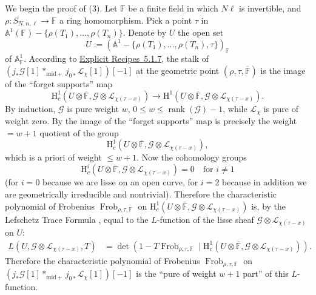 We begin the proof of (3). Let \(\mathbb{F}\) be a finite field in which
\(N\ell\) is invertible, and \(\rho:S_{N,n,\ell}\to\mathbb{F}\) a ring
homomorphism. Pick a point \(\tau\) in
\(\mathbb{A}^1(\mathbb{F})-\{\rho(T_1),\ldots,\rho(T_n)\}\). Denote by \(U\)
the open set
\[
  U:=(\mathbb{A}^1-\{\rho(T_1),\ldots,\rho(T_n),\tau\})_{\mathbb{F}}
\]
of \(\mathbb{A}^1_{\mathbb{F}}\). According to
\hyperref[recipe:5.1.7]{Explicit Recipes~5.1.7}, the stalk of
\((j_*\mathcal{G}[1]*_{\mathrm{mid}+}j_{0*}\mathcal{L}_\chi[1])[-1]\) at the
geometric point \((\rho,\tau,\overline{\mathbb{F}})\) is the image of the
``forget supports'' map
\[
  \mathrm{H}^1_c(U\otimes\overline{\mathbb{F}},
  \mathcal{G}\otimes\mathcal{L}_{\chi(\tau-x)})
  \to
  \mathrm{H}^1(U\otimes\overline{\mathbb{F}},
  \mathcal{G}\otimes\mathcal{L}_{\chi(\tau-x)}).
\]
By induction, \(\mathcal{G}\) is pure weight \(w\),
\(0\leq w\leq\operatorname{rank}(\mathcal{G})-1\), while
\(\mathcal{L}_\chi\) is pure of weight zero. By
\cite[3.2.3 and remark following its statement]{De-WeilII} the image of the
``forget supports'' map is precisely the weight \(=w+1\) quotient of the group
\[
  \mathrm{H}^1_c(U\otimes\overline{\mathbb{F}},
  \mathcal{G}\otimes\mathcal{L}_{\chi(\tau-x)}),
\]
which is a priori of weight \(\leq w+1\). Now the cohomology groups
\[
  \mathrm{H}^i_c(U\otimes\overline{\mathbb{F}},
  \mathcal{G}\otimes\mathcal{L}_{\chi(\tau-x)})=0
  \quad\text{for \(i\neq 1\)}
\]
(for \(i=0\) because we are lisse on an open curve, for \(i=2\) because in
addition we are geometrically irreducible and nontrivial). Therefore the
characteristic polynomial of Frobenius \(\operatorname{Frob}_{\rho,\tau,\mathbb{F}}\)
on
\(\mathrm{H}^1_c(U\otimes\overline{\mathbb{F}},
\mathcal{G}\otimes\mathcal{L}_{\chi(\tau-x)})\) is, by the Lefschetz Trace
Formula \cite{Gro-FL}, equal to the \(L\)-function of the lisse sheaf
\(\mathcal{G}\otimes\mathcal{L}_{\chi(\tau-x)}\) on \(U\):
\[
\begin{aligned}
  L(U,\mathcal{G}\otimes\mathcal{L}_{\chi(\tau-x)},T)
  &=
  \det(1-T\operatorname{Frob}_{\rho,\tau,\mathbb{F}}\mid
  \mathrm{H}^1_c(U\otimes\overline{\mathbb{F}},
  \mathcal{G}\otimes\mathcal{L}_{\chi(\tau-x)})).
\end{aligned}
\]
Therefore the characteristic polynomial of Frobenius
\(\operatorname{Frob}_{\rho,\tau,\mathbb{F}}\) on
\((j_*\mathcal{G}[1]*_{\mathrm{mid}+}j_{0*}\mathcal{L}_\chi[1])[-1]\) is the
``pure of weight \(w+1\) part'' of this \(L\)-function.

